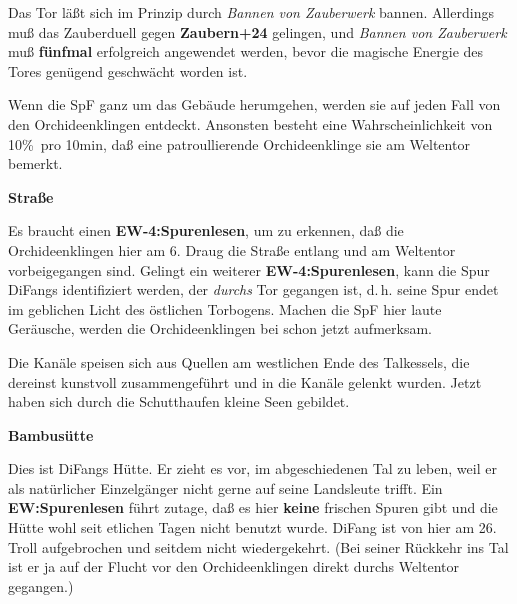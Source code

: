 \documentclass[
a4paper,
twoside,
DIV=calc,
BCOR=4mm,
fontsize=9pt,
twocolumn=on,
titlepage=on,
parskip=half
]{scrartcl}
\begin{document}
Das Tor läßt sich im Prinzip durch \emph{Bannen von Zauberwerk}
bannen. Allerdings muß das Zauberduell gegen \textbf{Zaubern+24}
gelingen, und \emph{Bannen von Zauberwerk} muß \textbf{fünfmal}
erfolgreich angewendet werden, bevor die magische Energie des Tores
genügend geschwächt worden ist.

Wenn die SpF ganz um das Gebäude herumgehen, werden sie auf jeden Fall
von den Orchideenklingen entdeckt. Ansonsten besteht eine
Wahrscheinlichkeit von 10\%\ pro 10min, daß eine patroullierende
Orchideenklinge sie am Weltentor bemerkt.

\textbf{ Straße}


Es braucht einen \textbf{EW-4:Spurenlesen}, um zu erkennen, daß die
Orchideenklingen hier am 6. Draug die Straße entlang und am Weltentor
vorbeigegangen sind. Gelingt ein weiterer \textbf{EW-4:Spurenlesen},
kann die Spur DiFangs identifiziert werden, der \emph{durchs} Tor
gegangen ist, d.\,h. seine Spur endet im geblichen Licht des östlichen
Torbogens. Machen die SpF hier laute Geräusche, werden die Orchideenklingen
bei  schon jetzt aufmerksam.

Die Kanäle speisen sich aus Quellen am westlichen Ende des Talkessels,
die dereinst kunstvoll zusammengeführt und in die Kanäle gelenkt
wurden. Jetzt haben sich durch die Schutthaufen kleine Seen gebildet.

\textbf{ Bambusütte}


Dies ist DiFangs Hütte. Er zieht es vor, im abgeschiedenen Tal zu
leben, weil er als natürlicher Einzelgänger nicht gerne auf seine
Landsleute trifft. Ein \textbf{EW:Spurenlesen} führt zutage, daß es
hier \textbf{keine} frischen Spuren gibt und die Hütte wohl seit
etlichen Tagen nicht benutzt wurde. DiFang ist von hier am 26. Troll
aufgebrochen und seitdem nicht wiedergekehrt. (Bei seiner Rückkehr ins
Tal ist er ja auf der Flucht vor den Orchideenklingen direkt durchs
Weltentor gegangen.)
\end{document}
